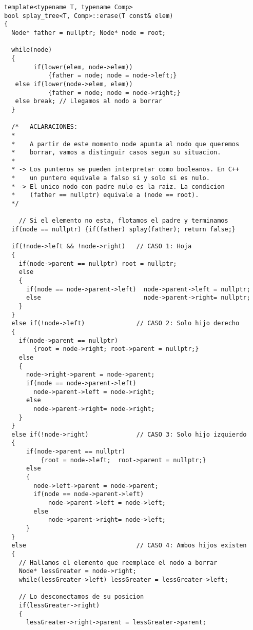 \documentclass[letterpaper,12pt]{article}
\begin{document}
\begin{lstlisting}
template<typename T, typename Comp>
bool splay_tree<T, Comp>::erase(T const& elem)
{
  Node* father = nullptr; Node* node = root;

  while(node)
  {
        if(lower(elem, node->elem)) 
            {father = node; node = node->left;}
   else if(lower(node->elem, elem)) 
            {father = node; node = node->right;}
   else break; // Llegamos al nodo a borrar
  }

  /*   ACLARACIONES:
  *
  *    A partir de este momento node apunta al nodo que queremos
  *    borrar, vamos a distinguir casos segun su situacion.
  *
  * -> Los punteros se pueden interpretar como booleanos. En C++ 
  *    un puntero equivale a falso si y solo si es nulo.
  * -> El unico nodo con padre nulo es la raiz. La condicion
  *    (father == nullptr) equivale a (node == root).
  */
  
    // Si el elemento no esta, flotamos el padre y terminamos
  if(node == nullptr) {if(father) splay(father); return false;}
  
  if(!node->left && !node->right)   // CASO 1: Hoja
  {
    if(node->parent == nullptr) root = nullptr;
    else
    {
      if(node == node->parent->left)  node->parent->left = nullptr;
      else                            node->parent->right= nullptr;
    }
  }
  else if(!node->left)              // CASO 2: Solo hijo derecho
  {
    if(node->parent == nullptr) 
        {root = node->right; root->parent = nullptr;}
    else
    {
      node->right->parent = node->parent;
      if(node == node->parent->left)  
        node->parent->left = node->right;
      else                            
        node->parent->right= node->right;
    }
  }
  else if(!node->right)             // CASO 3: Solo hijo izquierdo
  {
      if(node->parent == nullptr) 
          {root = node->left;  root->parent = nullptr;}
      else
      {
        node->left->parent = node->parent;
        if(node == node->parent->left)  
            node->parent->left = node->left;
        else                            
            node->parent->right= node->left;
      }
  }
  else                              // CASO 4: Ambos hijos existen
  {
    // Hallamos el elemento que reemplace el nodo a borrar
    Node* lessGreater = node->right; 
    while(lessGreater->left) lessGreater = lessGreater->left;

    // Lo desconectamos de su posicion
    if(lessGreater->right)
    {
      lessGreater->right->parent = lessGreater->parent;


\end{lstlisting}
\end{document}

